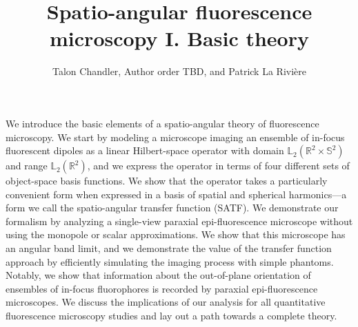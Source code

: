 \documentclass[]{osa-article}
\providecommand{\mbb}[1]{\mathbb{#1}}
\begin{document}
\title{Spatio-angular fluorescence microscopy I. Basic theory}

\author{Talon Chandler, Author order TBD, and Patrick La Rivi\`ere }

\address{University of Chicago, Department of Radiology, Chicago, Illinois 60637, USA\\
Publications Department, The Optical Society, 2010 Massachusetts Avenue NW, Washington, DC 20036, USA\\
Currently with the Department of Electronic Journals, The Optical Society, 2010 Massachusetts Avenue NW, Washington, DC 20036, USA}




\begin{abstract*}
  We introduce the basic elements of a spatio-angular theory of fluorescence
  microscopy. We start by modeling a microscope imaging an ensemble of in-focus
  fluorescent dipoles as a linear Hilbert-space operator with domain
  $\mbb{L}_2(\mbb{R}^2\times\mbb{S}^2)$ and range $\mbb{L}_2(\mbb{R}^2)$, and we
  express the operator in terms of four different sets of object-space basis
  functions. We show that the operator takes a particularly convenient form when
  expressed in a basis of spatial and spherical harmonics---a form we call the
  spatio-angular transfer function (SATF). We demonstrate our formalism by
  analyzing a single-view paraxial epi-fluorescence microscope without using the
  monopole or scalar approximations. We show that this microscope has an angular
  band limit, and we demonstrate the value of the transfer function approach by
  efficiently simulating the imaging process with simple phantoms. Notably, we
  show that information about the out-of-plane orientation of ensembles of
  in-focus fluorophores is recorded by paraxial epi-fluorescence microscopes. We
  discuss the implications of our analysis for all quantitative fluorescence
  microscopy studies and lay out a path towards a complete theory.
\end{abstract*}
\end{document}
